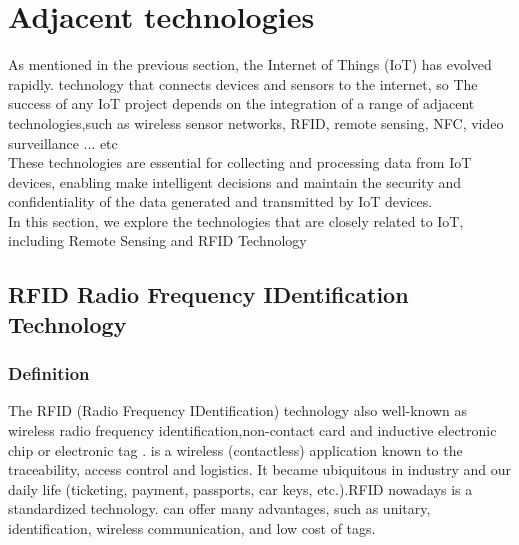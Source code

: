 \section{Adjacent technologies}

As mentioned in the previous section, the Internet of Things (IoT) has evolved rapidly. technology that connects devices and sensors to the internet, so The success of any IoT project depends on the integration of a range of adjacent technologies,such as  wireless sensor networks, RFID, remote sensing, NFC, video surveillance ... etc \\
These technologies are essential for collecting and processing data from IoT devices, enabling make intelligent decisions and maintain the security and confidentiality of the data generated and transmitted by IoT devices.\\
In this section, we explore the technologies that are closely related to IoT, including Remote Sensing and RFID Technology\\


\subsection{RFID Radio Frequency IDentification Technology}

\subsubsection{Definition}
The RFID (Radio Frequency IDentification) technology also well-known as wireless radio frequency identification,non-contact card and inductive electronic chip or electronic tag . is a wireless (contactless) application known to the traceability, access control and logistics. It became ubiquitous in industry and our daily life (ticketing, payment, passports, car keys, etc.).RFID nowadays is a standardized technology. can offer many advantages, such as unitary, identification, wireless communication, and low cost of tags.\cite{duroc2018rfid}\\

